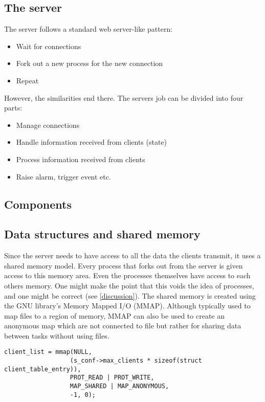 \documentclass[12pt,english,a4paper]{report}
\begin{document}
\subsection{The server}
The server follows a standard web server-like pattern:
\begin{itemize}
  \item Wait for connections
  \item Fork out a new process for the new connection
  \item Repeat
\end{itemize}
However, the similarities end there. The servers job can be divided into four parts:
\begin{itemize}
  \item Manage connections
  \item Handle information received from clients (state)
  \item Process information received from clients
  \item Raise alarm, trigger event etc.
\end{itemize}

\subsection{Components}


\subsection{Data structures and shared memory}
Since the server needs to have access to all the data the clients transmit, it uses a shared memory model. Every process that forks out from the server is given access to this memory area. Even the processes themselves have access to each others memory. One might make the point that this voids the idea of processes, and one might be correct (see \ref{discussion}). The shared memory is created using the GNU library's Memory Mapped I/O (MMAP). Although typically used to map files to a region of memory, MMAP can also be used to create an anonymous map which are not connected to file but rather for sharing data between tasks without using files.

\begin{lstlisting}
client_list = mmap(NULL, 
                  (s_conf->max_clients * sizeof(struct client_table_entry)), 
                  PROT_READ | PROT_WRITE,
                  MAP_SHARED | MAP_ANONYMOUS,
                  -1, 0);
\end{lstlisting}
\end{document}
